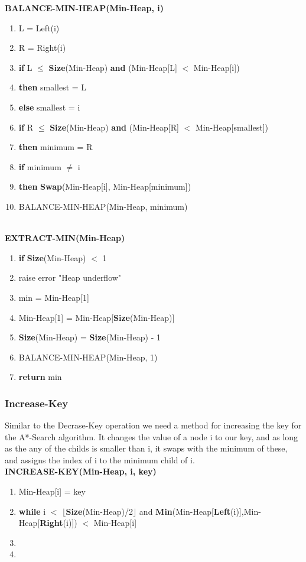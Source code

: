 \documentclass[11pt]{article}
\begin{document}
\textbf{BALANCE-MIN-HEAP(Min-Heap, i)}
\begin{enumerate}
\setlength\itemsep{0em}
\item L = Left(i)
\item R = Right(i)
\item \textbf{if } L $\leq$ \textbf{Size}(Min-Heap) \textbf{and} (Min-Heap[L] $<$ Min-Heap[i])
\item \tab \textbf{then } smallest = L
\item \tab \textbf{else } smallest = i
\item \textbf{if } R $\leq$ \textbf{Size}(Min-Heap) \textbf{and} (Min-Heap[R] $<$ Min-Heap[smallest])
\item \tab \textbf{then } minimum = R
\item \textbf{if } minimum $\neq$ i
\item \tab \textbf{then } \textbf{Swap}(Min-Heap[i], Min-Heap[minimum])
\item \tab \tab BALANCE-MIN-HEAP(Min-Heap, minimum)
\end{enumerate}
\ \\

\textbf{EXTRACT-MIN(Min-Heap)}
\begin{enumerate}
\setlength\itemsep{0em}
\item \textbf{if } \textbf{Size}(Min-Heap) $<$ 1
\item \tab raise error "Heap underflow"
\item min = Min-Heap[1]
\item Min-Heap[1] = Min-Heap[\textbf{Size}(Min-Heap)]
\item \textbf{Size}(Min-Heap) = \textbf{Size}(Min-Heap) - 1
\item BALANCE-MIN-HEAP(Min-Heap, 1)
\item \textbf{return} min
\end{enumerate}
\subsubsection{Increase-Key}
Similar to the Decrase-Key operation we need a method for increasing the key for the A*-Search algorithm. It changes the value of a node i to our key, and as long as the any of the childs is smaller than i, it swaps with the minimum of these, and assigns the index of i to the minimum child of i.\\

\textbf{INCREASE-KEY(Min-Heap, i, key)}
\begin{enumerate}
\setlength\itemsep{0em}
\item Min-Heap[i] = key
\item \textbf{while } i $<$ $\lfloor$\textbf{Size}(Min-Heap)/2$\rfloor$ and \textbf{Min}(Min-Heap[\textbf{Left}(i)],Min-Heap[\textbf{Right}(i)]) $<$ Min-Heap[i]
\item {}
\item {}
\end{enumerate}
\iffalse
\end{document}
